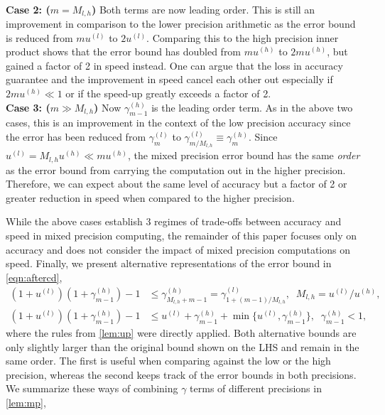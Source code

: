 \documentclass[review,onefignum,onetabnum]{siamart190516}
\begin{document}
\\
\textbf{Case 2: ($m = M_{l,h}$)}
Both terms are now leading order. 
This is still an improvement in comparison to the lower precision arithmetic as the error bound is reduced from $mu^{(l)}$ to $2u^{(l)}$.
Comparing this to the high precision inner product shows that the error bound has doubled from $mu^{(h)}$ to $2mu^{(h)}$, but gained a factor of 2 in speed instead. 
One can argue that the loss in accuracy guarantee and the improvement in speed cancel each other out especially if $2mu^{(h)}\ll 1$ or if the speed-up greatly exceeds a factor of 2. \\
\textbf{Case 3: ($m \gg M_{l,h}$)}
Now $\gamma_{m-1}^{(h)}$ is the leading order term. 
As in the above two cases, this is an improvement in the context of the low precision accuracy since the error has been reduced from $\gamma_m^{(l)}$ to $\gamma_{m/M_{l,h}}^{(l)}\equiv \gamma_m^{(h)}$. 
Since $u^{(l)} = M_{l,h}u^{(h)} \ll mu^{(h)}$, the mixed precision error bound has the same \emph{order} as the error bound from carrying the computation out in the higher precision. 
Therefore, we can expect about the same level of accuracy but a factor of 2 or greater reduction in speed when compared to the higher precision.\par
While the above cases establish 3 regimes of trade-offs between accuracy and speed in mixed precision computing, the remainder of this paper focuses only on accuracy and does not consider the impact of mixed precision computations on speed.
Finally, we present alternative representations of the error bound in \cref{eqn:aftercd},
\begin{align*}
(1+u^{(l)})(1+\gamma_{m-1}^{(h)})-1 &\leq \gamma_{M_{l,h}+m-1}^{(h)}=\gamma_{1+(m-1)/M_{l,h}}^{(l)}, \;\; M_{l,h} = u^{(l)}/u^{(h)},\\
(1+u^{(l)})(1+\gamma_{m-1}^{(h)})-1 &\leq  u^{(l)} + \gamma_{m-1}^{(h)} + \min\{u^{(l)}, \gamma_{m-1}^{(h)}\},\;\; \gamma_{m-1}^{(h)} < 1,
\end{align*}
where the rules from \cref{lem:up} were directly applied.
Both alternative bounds are only slightly larger than the original bound shown on the LHS and remain in the same order.
The first is useful when comparing against the low or the high precision, whereas the second keeps track of the error bounds in both precisions.
We summarize these ways of combining $\gamma$ terms of different precisions in \cref{lem:mp},
\end{document}
